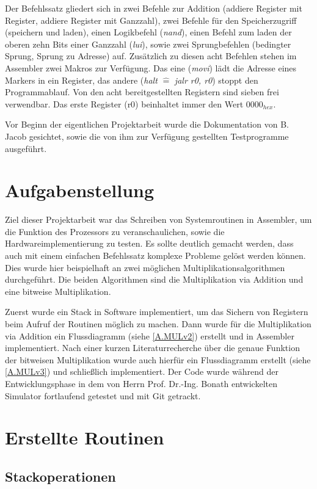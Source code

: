 \documentclass[fleqn, a4paper, 11pt]{article}       %
\begin{document}
Der Befehlssatz gliedert sich in zwei Befehle zur Addition (addiere Register mit Register, addiere Register mit Ganzzahl), zwei Befehle für den Speicherzugriff (speichern und laden), einen Logikbefehl (\emph{nand}), einen Befehl zum laden der oberen zehn Bits einer Ganzzahl (\emph{lui}), sowie zwei Sprungbefehlen (bedingter Sprung, Sprung zu Adresse) auf. Zusätzlich zu diesen acht Befehlen stehen im Assembler zwei Makros zur Verfügung. Das eine (\emph{movi}) lädt die Adresse eines Markers in ein Register, das andere (\emph{halt} $\widehat{=}$ \emph{jalr r0, r0}) stoppt den Programmablauf. Von den acht bereitgestellten Registern sind sieben frei verwendbar. Das erste Register (r0) beinhaltet immer den Wert $0000_{hex}$.

Vor Beginn der eigentlichen Projektarbeit wurde die Dokumentation von B. Jacob gesichtet, sowie die von ihm zur Verfügung gestellten Testprogramme ausgeführt.


\section{Aufgabenstellung}
Ziel dieser Projektarbeit war das Schreiben von Systemroutinen in Assembler, um die Funktion des Prozessors zu veranschaulichen, sowie die Hardwareimplementierung zu testen. Es sollte deutlich gemacht werden, dass auch mit einem einfachen Befehlssatz komplexe Probleme gelöst werden können. Dies wurde hier beispielhaft an zwei möglichen Multiplikationsalgorithmen durchgeführt. Die beiden Algorithmen sind die Multiplikation via Addition und eine bitweise Multiplikation.

Zuerst wurde ein Stack in Software implementiert, um das Sichern von Registern beim Aufruf der Routinen möglich zu machen. Dann wurde für die Multiplikation via Addition ein Flussdiagramm (siehe \ref{A.MULv2}) erstellt und in Assembler implementiert. Nach einer kurzen Literaturrecherche über die genaue Funktion der bitweisen Multiplikation wurde auch hierfür ein Flussdiagramm erstellt (siehe \ref{A.MULv3}) und schließlich implementiert. Der Code wurde während der Entwicklungsphase in dem von Herrn Prof. Dr.-Ing. Bonath entwickelten Simulator fortlaufend getestet und mit Git getrackt.

\section{Erstellte Routinen}
\subsection{Stackoperationen}
\end{document}

